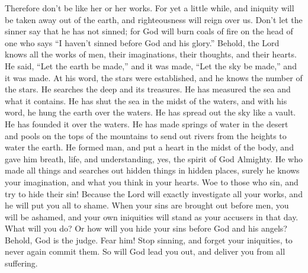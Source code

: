  Therefore don't be like her or her works.
 For yet a little while, and iniquity will be taken away
out of the earth, and righteousness will reign over us. 
Don't let the sinner say that he has not sinned; for God will burn coals
of fire on the head of one who says ``I haven't sinned before God and
his glory.''  Behold, the Lord knows all the works of
men, their imaginations, their thoughts, and their hearts.
 He said, ``Let the earth be made,'' and it was made,
``Let the sky be made,'' and it was made.  At his word,
the stars were established, and he knows the number of the stars.
 He searches the deep and its treasures. He has measured
the sea and what it contains.  He has shut the sea in the
midst of the waters, and with his word, he hung the earth over the
waters.  He has spread out the sky like a vault. He has
founded it over the waters.  He has made springs of water
in the desert and pools on the tops of the mountains to send out rivers
from the heights to water the earth.  He formed man, and
put a heart in the midst of the body, and gave him breath, life, and
understanding,  yes, the spirit of God Almighty. He who
made all things and searches out hidden things in hidden places,
 surely he knows your imagination, and what you think in
your hearts. Woe to those who sin, and try to hide their sin!
 Because the Lord will exactly investigate all your
works, and he will put you all to shame.  When your sins
are brought out before men, you will be ashamed, and your own iniquities
will stand as your accusers in that day.  What will you
do? Or how will you hide your sins before God and his angels?
 Behold, God is the judge. Fear him! Stop sinning, and
forget your iniquities, to never again commit them. So will God lead you
out, and deliver you from all suffering.

